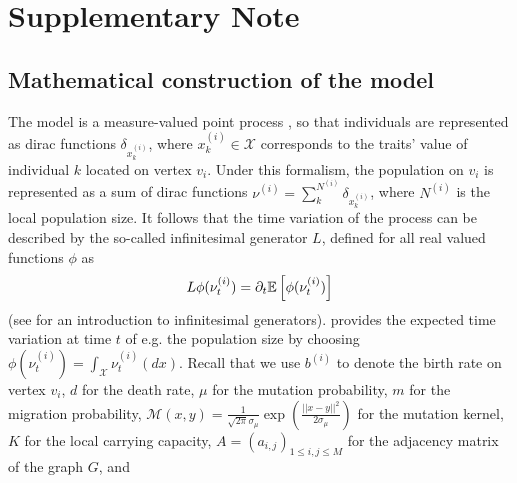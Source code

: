 \graphicspath{{./content/chap1_diff_in_graphs/figures/}}


\section{Supplementary Note}
    \label{secSI:diff-in-graphs}

    \subsection{Mathematical construction of the model}\label{secSI:formal_descrip}
    The model is a measure-valued point process \citep{Bansaye2015}, so that individuals are represented as dirac functions $\delta_{x_{k}^{(i)}}$, where $x_{k}^{(i)} \in \mathcal{X}$ corresponds to the traits' value of individual $k$ located on vertex $v_i$.
    Under this formalism, the population on $v_i$ is represented as a sum of dirac functions $\nu^{(i)} = \sum^{N^{(i)}}_k \delta_{x_{k}^{(i)}}$, where $N^{(i)}$ is the local population size. 
    It follows that the time variation of the process can be described by the so-called infinitesimal generator $L$, defined for all real valued functions $\phi$ as
    \begin{equation}\label{eqSI:def_infgen}
         L \phi(\nu^{(i)}_t) = \partial_t {\mathbb{E}} \left[\phi(\nu^{(i)}_t) \right]
    \end{equation}
    (see \citep{Linke2015} for an introduction to infinitesimal generators).  provides the expected time variation at time $t$ of e.g. the population size by choosing $\phi(\nu^{(i)}_t) = \int_\mathcal{X} \nu^{(i)}_t(dx)$.
    Recall that we use
    $b^{(i)}$ to denote the birth rate on vertex $v_i$,
    $d$ for the death rate,
    $\mu$ for the mutation probability,
    $m$ for the migration probability,
    $\mathcal{M}(x,y) = \frac{1}{\sqrt{2\pi}\sigma_\mu} \exp \left(\frac{||x-y||^2}{2\sigma_\mu} \right)$ for the mutation kernel,
    $K$ for the local carrying capacity,
    $A = (a_{i,j})_{1\leq i, j \leq M}$ for the adjacency matrix of the graph $G$, and
